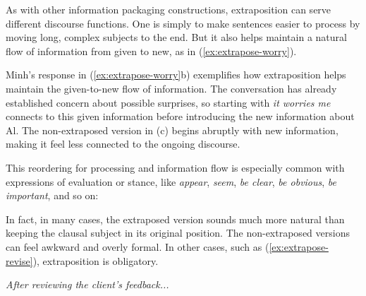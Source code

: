 As with other information packaging constructions, extraposition can serve different discourse functions. One is simply to make sentences easier to process by moving long, complex subjects to the end. But it also helps maintain a natural flow of information from given to new, as in (\ref{ex:extrapose-worry}).

\ea\label{ex:extrapose-worry}
    \z
\z

Minh's response in (\ref{ex:extrapose-worry}b) exemplifies how extraposition helps maintain the given-to-new flow of information. The conversation has already established concern about possible surprises, so starting with \textit{it worries me} connects to this given information before introducing the new information about Al. The non-extraposed version in (c) begins abruptly with new information, making it feel less connected to the ongoing discourse.

This reordering for processing and information flow is especially common with expressions of evaluation or stance, like \textit{appear}, \textit{seem}, \textit{be clear}, \textit{be obvious}, \textit{be important}, and so on:

\ea\label{ex:extrapose-seem}
    \z
\ex\label{ex:extrapose-clear}
    \z
\z

In fact, in many cases, the extraposed version sounds much more natural than keeping the clausal subject in its original position. The non-extraposed versions can feel awkward and overly formal. In other cases, such as (\ref{ex:extrapose-revise}), extraposition is obligatory.

\ea\label{ex:extrapose-revise}
    \textit{After reviewing the client's feedback...}
    \z
\z

